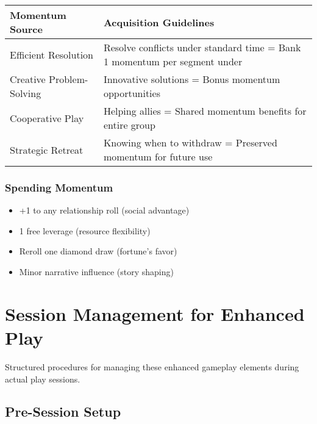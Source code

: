 \begin{fatebox}
\begin{tabularx}{\textwidth}{lX}
\toprule
\textbf{Momentum Source} & \textbf{Acquisition Guidelines} \\
\midrule
Efficient Resolution & Resolve conflicts under standard time = Bank 1 momentum per segment under \\
Creative Problem-Solving & Innovative solutions = Bonus momentum opportunities \\
Cooperative Play & Helping allies = Shared momentum benefits for entire group \\
Strategic Retreat & Knowing when to withdraw = Preserved momentum for future use \\
\bottomrule
\end{tabularx}
\end{fatebox}

\subsubsection*{Spending Momentum}

\begin{itemize}
    \item +1 to any relationship roll (social advantage)
    \item 1 free leverage (resource flexibility)
    \item Reroll one diamond draw (fortune's favor)
    \item Minor narrative influence (story shaping)
\end{itemize}

\section*{Session Management for Enhanced Play}

Structured procedures for managing these enhanced gameplay elements during actual play sessions.

\subsection*{Pre-Session Setup}

